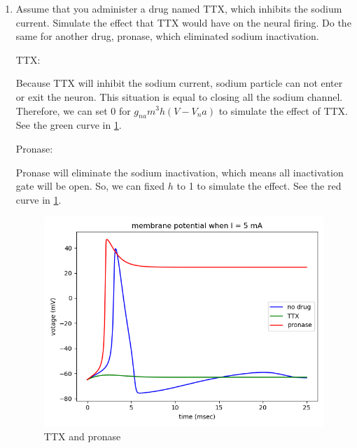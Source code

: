\documentclass[11pt]{article}
\begin{document}
\begin{enumerate}
		\item Assume that you administer a drug named TTX, which inhibits the sodium current. Simulate the effect that TTX would have on the neural firing. Do the same for another drug, pronase, which eliminated sodium inactivation.
		
		TTX:
		
		Because TTX will inhibit the sodium current, sodium particle can not enter or exit the neuron. This situation is equal to closing all the sodium channel. Therefore, we can set 0 for $g_{na}m^3h(V-V_na)$ to simulate the effect of TTX. See the green curve in \ref{fig:fig5}.
		
		Pronase:
		
		Pronase will eliminate the sodium inactivation, which means all inactivation gate will be open. So, we can fixed $h$ to 1 to simulate the effect. See the red curve in \ref{fig:fig5}.
		
		\begin{figure}[ht]
			\centering
			\includegraphics[scale=0.3]{plot_programming_6.png}
			\caption{TTX and pronase}
			\label{fig:fig5}
		\end{figure}
	\end{enumerate}
\end{document}
